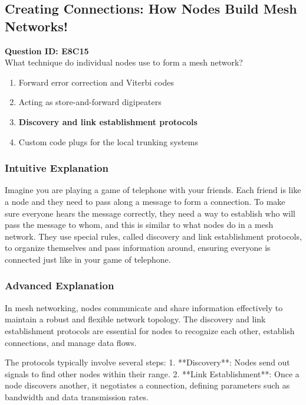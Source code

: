 \subsection{Creating Connections: How Nodes Build Mesh Networks!}

\begin{tcolorbox}
    \textbf{Question ID: E8C15} \\
    What technique do individual nodes use to form a mesh network? 
    \begin{enumerate}[label=\Alph*.]
        \item Forward error correction and Viterbi codes
        \item Acting as store-and-forward digipeaters
        \item \textbf{Discovery and link establishment protocols}
        \item Custom code plugs for the local trunking systems
    \end{enumerate}
\end{tcolorbox}

\subsubsection{Intuitive Explanation}
Imagine you are playing a game of telephone with your friends. Each friend is like a node and they need to pass along a message to form a connection. To make sure everyone hears the message correctly, they need a way to establish who will pass the message to whom, and this is similar to what nodes do in a mesh network. They use special rules, called discovery and link establishment protocols, to organize themselves and pass information around, ensuring everyone is connected just like in your game of telephone.

\subsubsection{Advanced Explanation}
In mesh networking, nodes communicate and share information effectively to maintain a robust and flexible network topology. The discovery and link establishment protocols are essential for nodes to recognize each other, establish connections, and manage data flows. 

The protocols typically involve several steps:
1. **Discovery**: Nodes send out signals to find other nodes within their range.
2. **Link Establishment**: Once a node discovers another, it negotiates a connection, defining parameters such as bandwidth and data transmission rates.

